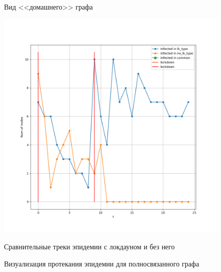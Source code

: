 \begin{figure}[h]
\begin{center}
\begin{minipage}{0.49\linewidth}
				\centering
				Вид <<домашнего>> графа
			\end{minipage}
		\end{center}
		
		\begin{center}
			\begin{minipage}{0.8\linewidth}
				\includegraphics[width=\linewidth, keepaspectratio]{../figs/evidence2/tracks}
				
				\centering
				Сравнительные треки эпидемии с локдауном и без него
			\end{minipage}
		\end{center}
		
		\caption{Визуализация протекания эпидемии для полносвязанного графа}\label{pic:evidence_1}
	\end{figure}
	
